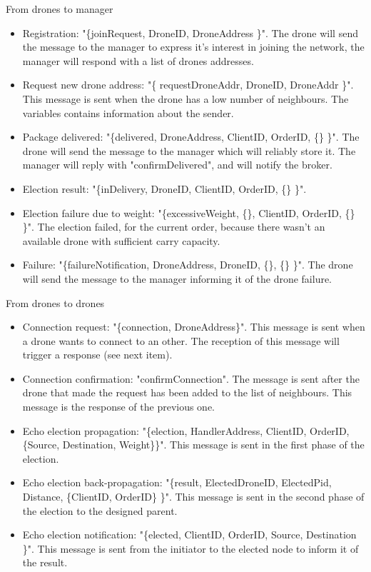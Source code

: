 \documentclass[a4paper, oneside]{memoir}
\begin{document}
From drones to manager
\begin{itemize}
	\item Registration:  "\{joinRequest, DroneID, DroneAddress \}".
	The drone will send the message to the manager to express it's interest in joining the network, the manager will respond with a list of drones addresses.

	\item Request new drone address: "\{ requestDroneAddr, DroneID, DroneAddr \}".
	This message is sent when the drone has a low number of neighbours. The variables contains information about the sender.

	\item Package delivered: "\{delivered, DroneAddress, ClientID, OrderID, \{\} \}".
	The drone will send the message to the manager which will reliably store it. The manager will reply with "confirmDelivered", and will notify the broker.

	\item Election result: "\{inDelivery, DroneID, ClientID, OrderID, \{\} \}".

	\item Election failure due to weight: "\{excessiveWeight, \{\}, ClientID, OrderID, \{\} \}".
	The election failed, for the current order, because there wasn't an available drone with sufficient carry capacity.

	\item Failure:  "\{failureNotification, DroneAddress, DroneID, \{\}, \{\} \}".
	The drone will send the message to the manager informing it of the drone failure.
\end{itemize} \vspace{1em}
From drones to drones
\begin{itemize}
	\item Connection request: "\{connection, DroneAddress\}".
	This message is sent when a drone wants to connect to an other. The reception of this message will trigger a response (see next item).

	\item Connection confirmation: "confirmConnection".
	The message is sent after the drone that made the request has been added to the list of neighbours. This message is the response of the previous one.

	\item Echo election propagation: "\{election, HandlerAddress, ClientID, OrderID, \{Source, Destination, Weight\}\}".
	This message is sent in the first phase of the election.

	\item Echo election back-propagation: "\{result, ElectedDroneID, ElectedPid, Distance, \{ClientID, OrderID\} \}".
	This message is sent in the second phase of the election to the designed parent.

	\item Echo election notification: "\{elected, ClientID, OrderID, Source, Destination \}".
	This message is sent from the initiator to the elected node to inform it of the result.
\end{itemize}
\newpage
\end{document}
